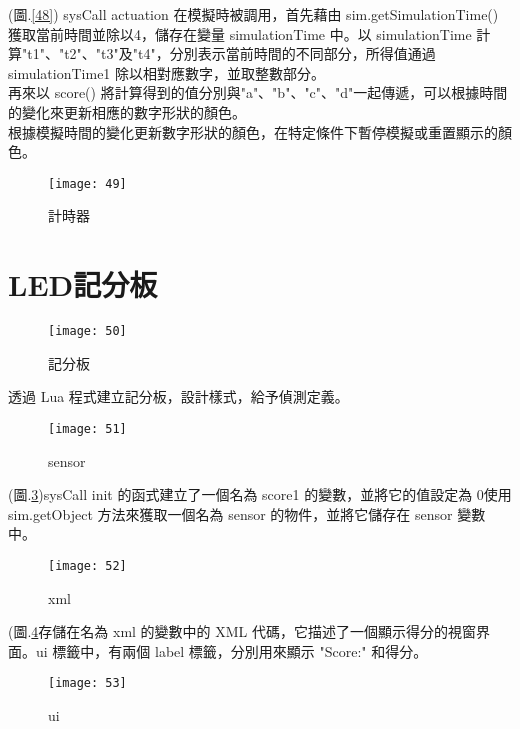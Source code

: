(圖.\ref{48}) sysCall actuation 在模擬時被調用，首先藉由 sim.getSimulationTime() 獲取當前時間並除以4，儲存在變量 simulationTime 中。以 simulationTime 計算"t1"、"t2"、"t3"及"t4"，分別表示當前時間的不同部分，所得值通過 simulationTime1 除以相對應數字，並取整數部分。\\
再來以 score() 將計算得到的值分別與"a"、"b"、"c"、"d"一起傳遞，可以根據時間的變化來更新相應的數字形狀的顏色。\\
  根據模擬時間的變化更新數字形狀的顏色，在特定條件下暫停模擬或重置顯示的顏色。\\\begin{figure}[hbt!]
\begin{center}
\texttt{[image: 49]}
\caption{\Large 計時器}\label{fig.49}
\end{center}
\end{figure}
\newpage
\section{LED記分板}
\begin{figure}[hbt!]
\begin{center}
\texttt{[image: 50]}
\caption{\Large 記分板}\label{50}
\end{center}
\end{figure}
透過 Lua 程式建立記分板，設計樣式，給予偵測定義。\\
\newpage
\begin{figure}[hbt!]
\begin{center}
\texttt{[image: 51]}
\caption{\Large sensor}\label{51}
\end{center}
\end{figure}

(圖.\ref{51})sysCall init 的函式建立了一個名為 score1 的變數，並將它的值設定為 0使用 sim.getObject 方法來獲取一個名為 sensor 的物件，並將它儲存在 sensor 變數中。\\
\begin{figure}[hbt!]
\begin{center}
\texttt{[image: 52]}
\caption{\Large xml}\label{52}
\end{center}
\end{figure}

(圖.\ref{52}存儲在名為 xml 的變數中的 XML 代碼，它描述了一個顯示得分的視窗界面。ui 標籤中，有兩個 label 標籤，分別用來顯示 "Score:" 和得分。\\
\begin{figure}[hbt!]
\begin{center}
\texttt{[image: 53]}
\caption{\Large ui}\label{53}
\end{center}
\end{figure}


